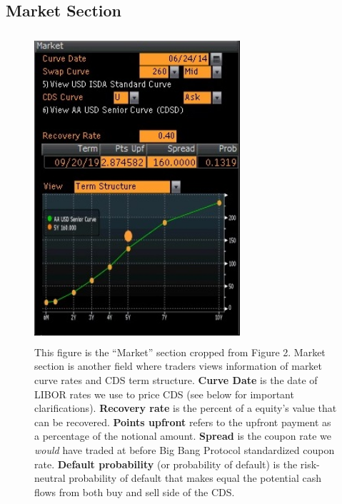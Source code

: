 \documentclass{jss}
\begin{document}
\subsection{Market Section}
\label{Market section}
\begin{figure}[H]
\centering
\includegraphics[width=3in, height=4.5in]{images/AlcoaIncCDSMarket.jpg}
\caption{
This figure is the ``Market'' section cropped from Figure 2. Market section is another field where traders views information of market curve rates and CDS term structure. \textbf{Curve Date} is the date of LIBOR rates we use to price CDS (see below for important clarifications). \textbf{Recovery rate} is the percent of a equity's value that can be recovered. \textbf{Points upfront} refers to the upfront payment as a percentage of the notional amount. \textbf{Spread} is the coupon rate we \textit{would} have traded at before Big Bang Protocol standardized coupon rate. \textbf{Default probability} (or probability of default) is the risk-neutral probability of default that makes equal the potential cash flows from both buy and sell side of the CDS.}

\label{AlcoaIncCDSMarket}
\end{figure}
\end{document}
